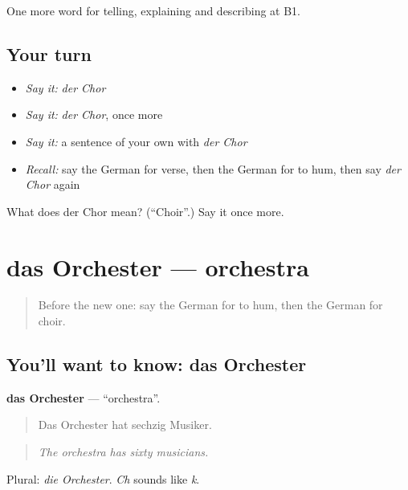 \begin{grammarlens}[title={What you've built}]
One more word for telling, explaining and describing at B1.
\end{grammarlens}

\subsection*{Your turn}
\begin{itemize}
\raggedright
  \item \emph{Say it:} \emph{der Chor}
  \item \emph{Say it:} \emph{der Chor}, once more
  \item \emph{Say it:} a sentence of your own with \emph{der Chor}
  \item \emph{Recall:} say the German for verse, then the German for to hum, then say \emph{der Chor} again
\end{itemize}

\begin{tcolorbox}[breakable,colback=teal!4,colframe=teal!35!black,title={Before you move on}]
What does der Chor mean? (\textquotedblleft{}Choir\textquotedblright{}.) Say it once more.
\end{tcolorbox}
\section[das Orchester]{das Orchester — orchestra}

\label{lesson:GE-C515-orchester}



\begin{quote}
Before the new one: say the German for to hum, then the German for choir.
\end{quote}

\subsection*{You'll want to know: das Orchester}
\textbf{das Orchester} — \textquotedblleft{}orchestra\textquotedblright{}.

\begin{quote}
Das Orchester hat sechzig Musiker.
\end{quote}

\begin{quote}
\emph{The orchestra has sixty musicians.}
\end{quote}

Plural: \emph{die Orchester}. \emph{Ch} sounds like \emph{k}.

